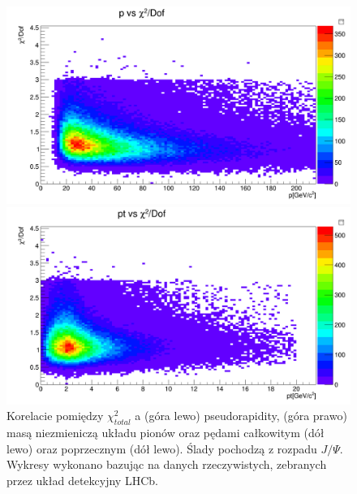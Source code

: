 \begin{figure}[H]
\vspace*{0.5cm} %
\begin{minipage}[t]{0.5\textwidth}
\includegraphics[width=\linewidth]{rozdzial6/JPsi_p_chi2_data.png}
\end{minipage}
\hspace{\fill}
\begin{minipage}[t]{0.5\textwidth}
\includegraphics[width=\linewidth]{rozdzial6/JPsi_pt_chi2_data.png}
\end{minipage}
\caption{Korelacie pomiędzy $\chi^2_{total}$  a (góra lewo) pseudorapidity, (góra prawo) masą niezmieniczą układu pionów oraz pędami całkowitym (dół lewo) oraz poprzecznym (dół lewo). Ślady pochodzą z rozpadu $J / \Psi$. Wykresy wykonano bazując na danych rzeczywistych, zebranych przez układ detekcyjny LHCb.} \label{corr_chi2JPsi_data}
\end{figure}

